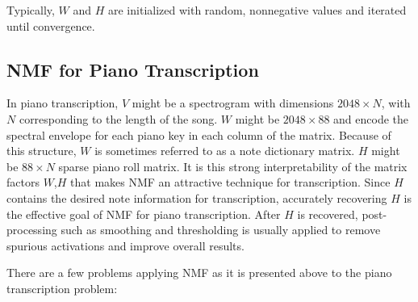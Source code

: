 \documentclass[5p]{elsarticle}
\begin{document}
\noindent Typically, $W$ and $H$ are initialized with random, nonnegative values and iterated until convergence. 

\subsection{NMF for Piano Transcription}
In piano transcription, $V$ might be a spectrogram with dimensions $2048 \times N$, with $N$ corresponding to the length of the song. $W$ might be $2048 \times 88$ and encode the spectral envelope for each piano key in each column of the matrix. Because of this structure, $W$ is sometimes referred to as a note dictionary matrix. $H$ might be $88 \times N$ sparse piano roll matrix. It is this strong interpretability of the matrix factors $W$,$H$ that makes NMF an attractive technique for transcription.  Since $H$ contains the desired note information for transcription, accurately recovering $H$ is the effective goal of NMF for piano transcription. After $H$ is recovered, post-processing such as smoothing and thresholding is usually applied to remove spurious activations and improve overall results.


There are a few problems applying NMF as it is presented above to the piano transcription problem:
\end{document}

